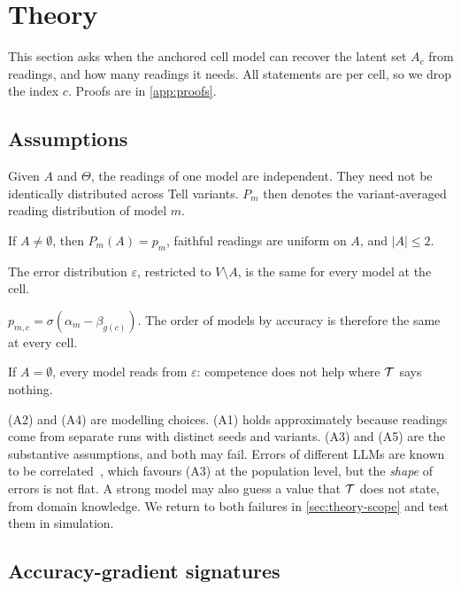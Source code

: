 \section{Theory}
\label{sec:theory}

This section asks when the anchored cell model can recover the latent set $A_c$ from readings, and how many readings it needs. All statements are per cell, so we drop the index $c$. Proofs are in \cref{app:proofs}.

\subsection{Assumptions}

\begin{description}[leftmargin=2.2em,style=nextline]
\item[(A1) Independence.] Given $A$ and $\Theta$, the readings of one model are independent. They need not be identically distributed across Tell variants. $P_m$ then denotes the variant-averaged reading distribution of model $m$.
\item[(A2) Accuracy parametrisation.] If $A\neq\emptyset$, then $P_m(A)=p_m$, faithful readings are uniform on $A$, and $|A|\le2$.
\item[(A3) Shared errors.] The error distribution $\varepsilon$, restricted to $V\setminus A$, is the same for every model at the cell.
\item[(A4) Monotone accuracy.] $p_{m,c}=\sigma(\alpha_m-\beta_{g(c)})$. The order of models by accuracy is therefore the same at every cell.
\item[(A5) Silence.] If $A=\emptyset$, every model reads from $\varepsilon$: competence does not help where $\mathcal{T}$ says nothing.
\end{description}

(A2) and (A4) are modelling choices. (A1) holds approximately because readings come from separate runs with distinct seeds and variants. (A3) and (A5) are the substantive assumptions, and both may fail. Errors of different LLMs are known to be correlated~\cite{kim2025correlated,goel2025great}, which favours (A3) at the population level, but the \emph{shape} of errors is not flat. A strong model may also guess a value that $\mathcal{T}$ does not state, from domain knowledge. We return to both failures in \cref{sec:theory-scope} and test them in simulation.

\subsection{Accuracy-gradient signatures}

